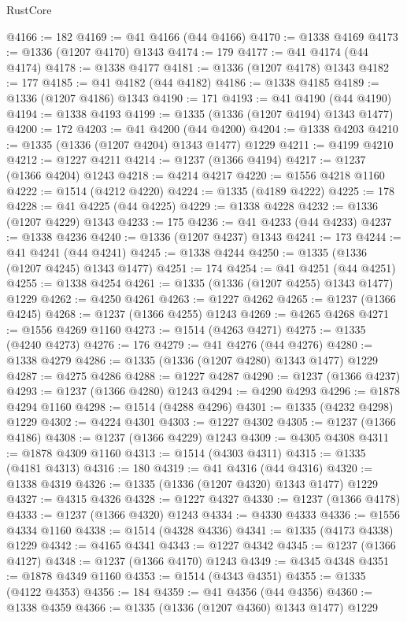 \begin{lexlean}{RustCore}
\begin{coremodule}
@4166 := 182
@4169 := @41 @4166 (@44 @4166)
@4170 := @1338 @4169
@4173 := @1336 (@1207 @4170) @1343
@4174 := 179
@4177 := @41 @4174 (@44 @4174)
@4178 := @1338 @4177
@4181 := @1336 (@1207 @4178) @1343
@4182 := 177
@4185 := @41 @4182 (@44 @4182)
@4186 := @1338 @4185
@4189 := @1336 (@1207 @4186) @1343
@4190 := 171
@4193 := @41 @4190 (@44 @4190)
@4194 := @1338 @4193
@4199 := @1335 (@1336 (@1207 @4194) @1343 @1477)
@4200 := 172
@4203 := @41 @4200 (@44 @4200)
@4204 := @1338 @4203
@4210 := @1335 (@1336 (@1207 @4204) @1343 @1477) @1229
@4211 := @4199 @4210
@4212 := @1227 @4211
@4214 := @1237 (@1366 @4194)
@4217 := @1237 (@1366 @4204) @1243
@4218 := @4214 @4217
@4220 := @1556 @4218 @1160
@4222 := @1514 (@4212 @4220)
@4224 := @1335 (@4189 @4222)
@4225 := 178
@4228 := @41 @4225 (@44 @4225)
@4229 := @1338 @4228
@4232 := @1336 (@1207 @4229) @1343
@4233 := 175
@4236 := @41 @4233 (@44 @4233)
@4237 := @1338 @4236
@4240 := @1336 (@1207 @4237) @1343
@4241 := 173
@4244 := @41 @4241 (@44 @4241)
@4245 := @1338 @4244
@4250 := @1335 (@1336 (@1207 @4245) @1343 @1477)
@4251 := 174
@4254 := @41 @4251 (@44 @4251)
@4255 := @1338 @4254
@4261 := @1335 (@1336 (@1207 @4255) @1343 @1477) @1229
@4262 := @4250 @4261
@4263 := @1227 @4262
@4265 := @1237 (@1366 @4245)
@4268 := @1237 (@1366 @4255) @1243
@4269 := @4265 @4268
@4271 := @1556 @4269 @1160
@4273 := @1514 (@4263 @4271)
@4275 := @1335 (@4240 @4273)
@4276 := 176
@4279 := @41 @4276 (@44 @4276)
@4280 := @1338 @4279
@4286 := @1335 (@1336 (@1207 @4280) @1343 @1477) @1229
@4287 := @4275 @4286
@4288 := @1227 @4287
@4290 := @1237 (@1366 @4237)
@4293 := @1237 (@1366 @4280) @1243
@4294 := @4290 @4293
@4296 := @1878 @4294 @1160
@4298 := @1514 (@4288 @4296)
@4301 := @1335 (@4232 @4298) @1229
@4302 := @4224 @4301
@4303 := @1227 @4302
@4305 := @1237 (@1366 @4186)
@4308 := @1237 (@1366 @4229) @1243
@4309 := @4305 @4308
@4311 := @1878 @4309 @1160
@4313 := @1514 (@4303 @4311)
@4315 := @1335 (@4181 @4313)
@4316 := 180
@4319 := @41 @4316 (@44 @4316)
@4320 := @1338 @4319
@4326 := @1335 (@1336 (@1207 @4320) @1343 @1477) @1229
@4327 := @4315 @4326
@4328 := @1227 @4327
@4330 := @1237 (@1366 @4178)
@4333 := @1237 (@1366 @4320) @1243
@4334 := @4330 @4333
@4336 := @1556 @4334 @1160
@4338 := @1514 (@4328 @4336)
@4341 := @1335 (@4173 @4338) @1229
@4342 := @4165 @4341
@4343 := @1227 @4342
@4345 := @1237 (@1366 @4127)
@4348 := @1237 (@1366 @4170) @1243
@4349 := @4345 @4348
@4351 := @1878 @4349 @1160
@4353 := @1514 (@4343 @4351)
@4355 := @1335 (@4122 @4353)
@4356 := 184
@4359 := @41 @4356 (@44 @4356)
@4360 := @1338 @4359
@4366 := @1335 (@1336 (@1207 @4360) @1343 @1477) @1229

\end{coremodule}
\end{lexlean}

